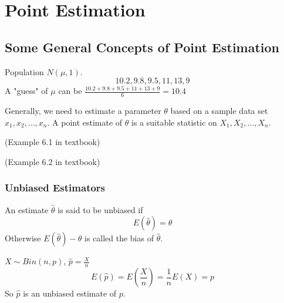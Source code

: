 \chapter{Point Estimation}
\section{Some General Concepts of Point Estimation}
\begin{exmp}
Population $N(\mu,1)$.
\[10.2, 9.8, 9.5, 11, 13, 9\]
A "guess" of $\mu$ can be $\frac{10.2+9.8+9.5+11+13+9}{6}=10.4$
\end{exmp}

\begin{defn}
Generally, we need to estimate a parameter $\theta$ based on a sample data set $x_1,x_2,\dots,x_n$. A point estimate of $\theta$ is a suitable statistic on $X_1,X_2,\dots,X_n$.
\end{defn}

\begin{exmp}
(Example 6.1 in textbook)
\end{exmp}

\begin{exmp}
(Example 6.2 in textbook)
\end{exmp}

\subsection{Unbiased Estimators}
\begin{defn}
An estimate $\hat{\theta}$ is said to be unbiased if
\[E(\hat{\theta})=\theta\]
Otherwise $E(\hat{\theta})-\theta$ is called the bias of $\hat{\theta}$.
\end{defn}

\begin{exmp}
$X \sim Bin(n,p)$, $\hat{p}=\frac{X}{n}$
\[E(\hat{p})=E\left(\frac{X}{n}\right)=\frac{1}{n}E(X)=p\]
So $\hat{p}$ is an unbiased estimate of $p$.
\end{exmp}

